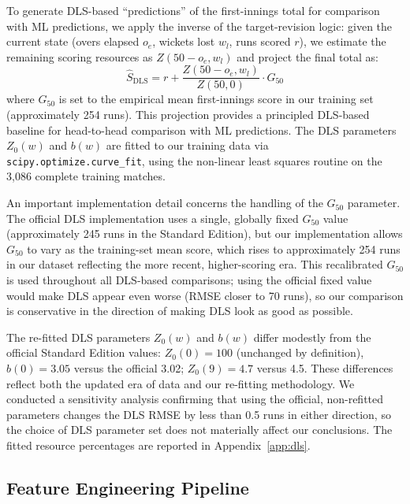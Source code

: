\documentclass[10pt,a4paper,twocolumn]{article}
\begin{document}
To generate DLS-based ``predictions'' of the first-innings total for comparison with ML predictions, we apply the inverse of the target-revision logic: given the current state (overs elapsed $o_e$, wickets lost $w_l$, runs scored $r$), we estimate the remaining scoring resources as $Z(50 - o_e, w_l)$ and project the final total as:
\begin{equation}
\hat{S}_{\text{DLS}} = r + \frac{Z(50 - o_e, w_l)}{Z(50, 0)} \cdot G_{50}
\label{eq:dls_predict}
\end{equation}
where $G_{50}$ is set to the empirical mean first-innings score in our training set (approximately 254 runs). This projection provides a principled DLS-based baseline for head-to-head comparison with ML predictions. The DLS parameters $Z_0(w)$ and $b(w)$ are fitted to our training data via \texttt{scipy.optimize.curve\_fit}, using the non-linear least squares routine on the 3,086 complete training matches.

An important implementation detail concerns the handling of the $G_{50}$ parameter. The official DLS implementation uses a single, globally fixed $G_{50}$ value (approximately 245 runs in the Standard Edition), but our implementation allows $G_{50}$ to vary as the training-set mean score, which rises to approximately 254 runs in our dataset reflecting the more recent, higher-scoring era. This recalibrated $G_{50}$ is used throughout all DLS-based comparisons; using the official fixed value would make DLS appear even worse (RMSE closer to 70 runs), so our comparison is conservative in the direction of making DLS look as good as possible.

The re-fitted DLS parameters $Z_0(w)$ and $b(w)$ differ modestly from the official Standard Edition values: $Z_0(0) = 100$ (unchanged by definition), $b(0) = 3.05$ versus the official 3.02; $Z_0(9) = 4.7$ versus 4.5. These differences reflect both the updated era of data and our re-fitting methodology. We conducted a sensitivity analysis confirming that using the official, non-refitted parameters changes the DLS RMSE by less than 0.5 runs in either direction, so the choice of DLS parameter set does not materially affect our conclusions. The fitted resource percentages are reported in Appendix~\ref{app:dls}.

\subsection{Feature Engineering Pipeline}
\label{sec:features}
\end{document}
